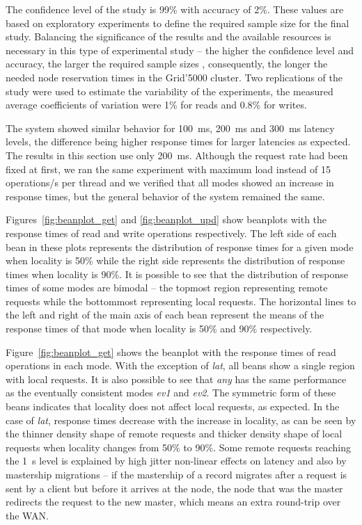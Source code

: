 \documentclass[man,floatsintext,12pt]{apa6}
\begin{document}
The confidence level of the study is 99\% with accuracy of 2\%. These values
are based on exploratory experiments to define the required sample size for the
final study. Balancing the significance of the results and the available
resources is necessary in this type of experimental study -- the higher the
confidence level and accuracy, the larger the required sample sizes
\parencite{Jain1991}, consequently, the longer the needed node reservation
times in the Grid'5000 cluster. Two replications of the study were used to
estimate the variability of the experiments, the measured average coefficients
of variation were 1\% for reads and 0.8\% for writes.

The system showed similar behavior for 100~ms, 200~ms and 300~ms latency
levels, the difference being higher response times for larger latencies as
expected. The results in this section use only 200~ms. Although the request
rate had been fixed at first, we ran the same experiment with maximum load
instead of 15 operations/s per thread and we verified that all modes showed an
increase in response times, but the general behavior of the system remained the
same.

Figures~\ref{fig:beanplot_get} and \ref{fig:beanplot_upd} show beanplots
with the response times of read and write operations respectively. The left
side of each bean in these plots represents the distribution of response times
for a given mode when locality is 50\% while the right side represents the
distribution of response times when locality is 90\%. It is possible to see
that the distribution of response times of some modes are bimodal -- the
topmost region representing remote requests while the bottommost representing
local requests. The horizontal lines to the left and right of the main axis of
each bean represent the means of the response times of that mode when locality
is 50\% and 90\% respectively.

Figure~\ref{fig:beanplot_get} shows the beanplot with the response times of
read operations in each mode. With the exception of \textit{lat}, all beans
show a single region with local requests. It is also possible to see that
\textit{any} has the same performance as the eventually consistent modes
\textit{ev1} and \textit{ev2}. The symmetric form of these beans indicates that
locality does not affect local requests, as expected. In the case of
\textit{lat}, response times decrease with the increase in locality, as can be
seen by the thinner density shape of remote requests and thicker density shape
of local requests when locality changes from 50\% to 90\%. Some remote requests
reaching the 1~s level is explained by high jitter non-linear effects on
latency and also by mastership migrations -- if the mastership of a record migrates
after a request is sent by a client but before it arrives at the node, the node
that was the master redirects the request to the new master, which means an
extra round-trip over the WAN.
\end{document}
